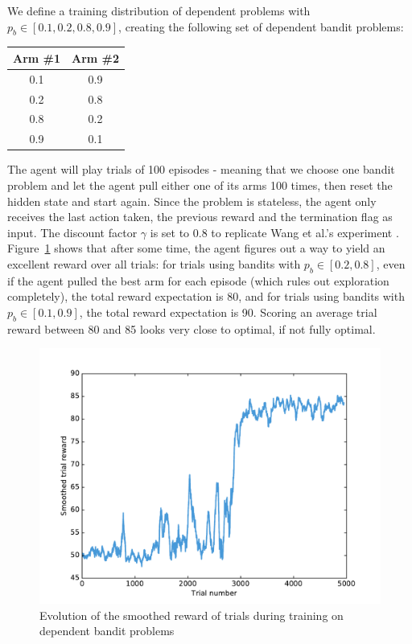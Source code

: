 We define a training distribution of dependent problems with
$p_b \in [0.1, 0.2, 0.8, 0.9]$, creating the following set of dependent
bandit problems:
\begin{table}[H]
	\centering
	\begin{tabular}{c|c}
		Arm \#1 & Arm \#2 \\ \hline
		0.1 & 0.9 \\ \hline
		0.2 & 0.8 \\ \hline
		0.8 & 0.2 \\ \hline
		0.9 & 0.1
	\end{tabular}
\end{table}

The agent will play trials of 100 episodes - meaning that we choose one bandit
problem and let the agent pull either one of its arms 100 times, then reset
the hidden state and start again. Since the problem is stateless, the agent
only receives the last action taken, the previous reward and the termination
flag as input. The discount factor $\gamma$ is set to 0.8 to replicate 
Wang et al.'s experiment \cite{learningtorl}.\\

Figure~\ref{fig:bandit_reward} shows that after some time, the agent figures out
a way to yield an excellent reward over all trials: for trials using bandits
with $p_b \in [0.2, 0.8]$, even if the agent pulled the best arm for
each episode (which rules out exploration completely), the total reward
expectation is 80, and for trials using bandits with $p_b \in [0.1, 0.9]$, 
the total reward expectation is 90. Scoring an average trial reward between
80 and 85 looks very close to optimal, if not fully optimal.\\

\begin{figure}
	\centering
	\includegraphics[width=0.8\linewidth]{fig/bandit_reward.pdf}
	\caption{Evolution of the smoothed reward of trials during training on
	dependent bandit problems}
	\label{fig:bandit_reward}
\end{figure}

